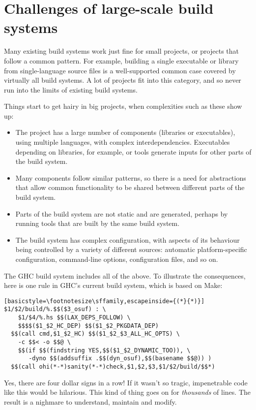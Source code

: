 \section{Challenges of large-scale build systems\label{sec:challenges}}

Many existing build systems work just fine for small projects, or
projects that follow a common pattern.  For example, building a single
executable or library from single-language source files is a
well-supported common case covered by virtually all build systems.  A
lot of projects fit into this category, and so never run into the
limits of existing build systems.

Things start to get hairy in big projects, when complexities such as these
show up:
\begin{itemize}
\item The project has a large number of components (libraries or
  executables), using multiple languages, with complex
  interdependencies.  Executables depending on libraries, for example,
  or tools generate inputs for other parts of the build system.
\item Many components follow similar patterns, so there is a need for
  abstractions that allow common functionality to be shared between
  different parts of the build system.
\item Parts of the build system are not static and are generated,
  perhaps by running tools that are built by the same build system.
\item The build system has complex configuration, with aspects of its
  behaviour being controlled by a variety of different sources:
  automatic platform-specific configuration, command-line options,
  configuration files, and so on.
\end{itemize}
The GHC build system includes all of the above. To illustrate the
consequences, here is one rule in GHC's current build system, which
is based on Make:
\begin{lstlisting}[basicstyle=\footnotesize\sffamily,escapeinside={(*}{*)}]
$1/$2/build/%.$$($3_osuf) : \
    $1/$4/%.hs $$(LAX_DEPS_FOLLOW) \
    $$$$($1_$2_HC_DEP) $$($1_$2_PKGDATA_DEP)
  $$(call cmd,$1_$2_HC) $$($1_$2_$3_ALL_HC_OPTS) \
    -c $$< -o $$@ \
    $$(if $$(findstring YES,$$($1_$2_DYNAMIC_TOO)), \
       -dyno $$(addsuffix .$$(dyn_osuf),$$(basename $$@)) )
  $$(call ohi(*-*)sanity(*-*)check,$1,$2,$3,$1/$2/build/$$*)
\end{lstlisting}
Yes, there are four dollar signs in a row!  If it wasn't so tragic,
impenetrable code like this would be hilarious.  This kind of thing
goes on for \emph{thousands} of lines.  The result is a nighmare to
understand, maintain and modify.

